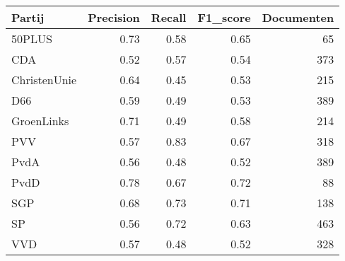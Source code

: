 \begin{tabular}{lrrrr}
\toprule
       Partij &  Precision &  Recall &  F1\_score &  Documenten \\
\midrule
       50PLUS &       0.73 &    0.58 &      0.65 &          65 \\
          CDA &       0.52 &    0.57 &      0.54 &         373 \\
 ChristenUnie &       0.64 &    0.45 &      0.53 &         215 \\
          D66 &       0.59 &    0.49 &      0.53 &         389 \\
   GroenLinks &       0.71 &    0.49 &      0.58 &         214 \\
          PVV &       0.57 &    0.83 &      0.67 &         318 \\
         PvdA &       0.56 &    0.48 &      0.52 &         389 \\
         PvdD &       0.78 &    0.67 &      0.72 &          88 \\
          SGP &       0.68 &    0.73 &      0.71 &         138 \\
           SP &       0.56 &    0.72 &      0.63 &         463 \\
          VVD &       0.57 &    0.48 &      0.52 &         328 \\
\bottomrule
\end{tabular}

